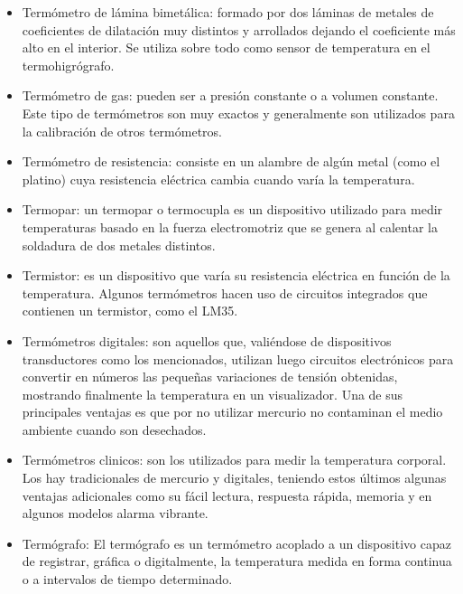 \begin{itemize}
			\item Termómetro de lámina bimetálica: formado por dos láminas de metales de coeficientes de dilatación muy distintos y arrollados dejando el coeficiente más alto en el interior. Se utiliza sobre todo como sensor de temperatura en el termohigrógrafo.
			
			\item Termómetro de gas: pueden ser a presión constante o a volumen constante. Este tipo de termómetros son muy exactos y generalmente son utilizados para la calibración de otros termómetros.
			
			\item Termómetro de resistencia: consiste en un alambre de algún metal (como el platino) cuya resistencia eléctrica cambia cuando varía la temperatura.
			
			\newpage
			\thispagestyle{plain}
			
			\item Termopar: un termopar o termocupla es un dispositivo utilizado para medir temperaturas basado en la fuerza electromotriz que se genera al calentar la soldadura de dos metales distintos.
			
			\item Termistor:  es un dispositivo que varía su resistencia eléctrica en función de la temperatura. Algunos termómetros hacen uso de circuitos integrados que contienen un termistor, como el LM35.
			
			\item Termómetros digitales: son aquellos que, valiéndose de dispositivos transductores como los mencionados, utilizan luego circuitos electrónicos para convertir en números las pequeñas variaciones de tensión obtenidas, mostrando finalmente la temperatura en un visualizador. Una de sus principales ventajas es que por no utilizar mercurio no contaminan el medio ambiente cuando son desechados.
			
			\item Termómetros clinicos: son los utilizados para medir la temperatura corporal. Los hay tradicionales de mercurio y digitales, teniendo estos últimos algunas ventajas adicionales como su fácil lectura, respuesta rápida, memoria y en algunos modelos alarma vibrante.
			
			
			
			\item Termógrafo: El termógrafo es un termómetro acoplado a un dispositivo capaz de registrar, gráfica o digitalmente, la temperatura medida en forma continua o a intervalos de tiempo determinado.
			
		\end{itemize}